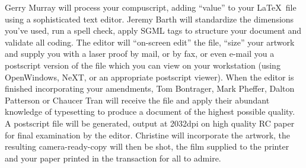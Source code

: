 \documentclass[journal,transmag]{IEEEtran}
\begin{document}
\begin{IEEEbiography}{Gerry Murray} will process your compu\-script,
adding ``value'' to your \LaTeX\ file using a sophisticated text
editor. Jeremy Barth will standardize the dimensions you've used, run
a spell check, apply SGML tags to structure your document and validate
all coding. The editor will ``on-screen edit'' the file, ``size'' your
artwork and supply you with a laser proof by mail, or by fax, or even
e-mail you a postscript version of the file which you can view on your
workstation (using OpenWindows, NeXT, or an appropriate postscript
viewer). When the editor is finished incorporating your amendments,
Tom Bontrager, Mark Pheffer, Dalton Patterson or Chaucer Tran will
receive the file and apply their abundant knowledge of typesetting to
produce a document of the highest possible quality. A postscript file
will be generated, output at 2032dpi on high quality RC paper for
final examination by the editor. Christine will incorporate the
artwork, the resulting camera-ready-copy will then be shot, the film
supplied to the printer and your paper printed in the transaction for
all to admire.
\end{IEEEbiography}
\end{document}
